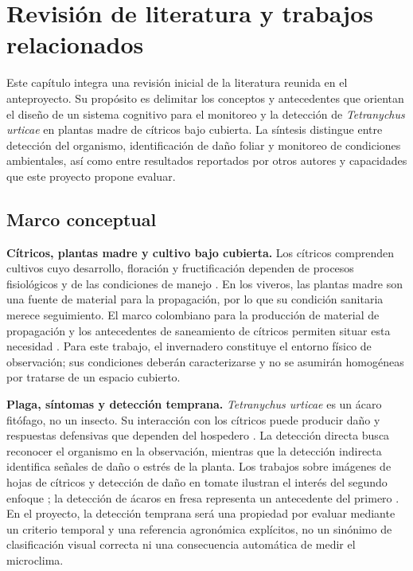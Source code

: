 
\chapter{Revisión de literatura y trabajos relacionados}
\label{cap:estado-del-arte}

Este capítulo integra una revisión inicial de la literatura reunida en el
anteproyecto. Su propósito es delimitar los conceptos y antecedentes que
orientan el diseño de un sistema cognitivo para el monitoreo y la detección
de \textit{Tetranychus urticae} en plantas madre de cítricos bajo cubierta.
La síntesis distingue entre detección del organismo, identificación de daño
foliar y monitoreo de condiciones ambientales, así como entre resultados
reportados por otros autores y capacidades que este proyecto propone evaluar.

\section{Marco conceptual}
\label{sec:marco-conceptual}

\textbf{Cítricos, plantas madre y cultivo bajo cubierta.}
Los cítricos comprenden cultivos cuyo desarrollo, floración y fructificación
dependen de procesos fisiológicos y de las condiciones de manejo
\cite{gill2023citrus}. En los viveros, las plantas madre son una fuente de
material para la propagación, por lo que su condición sanitaria merece
seguimiento. El marco colombiano para la producción de material de propagación
y los antecedentes de saneamiento de cítricos permiten situar esta necesidad
\cite{ica2019resolucion,citrusCenter2012}. Para este trabajo, el invernadero
constituye el entorno físico de observación; sus condiciones deberán
caracterizarse y no se asumirán homogéneas por tratarse de un espacio cubierto.

\textbf{Plaga, síntomas y detección temprana.}
\textit{Tetranychus urticae} es un ácaro fitófago, no un insecto. Su interacción
con los cítricos puede producir daño y respuestas defensivas que dependen del
hospedero \cite{mesa2012acaros,agut2015}. La detección directa busca reconocer
el organismo en la observación, mientras que la detección indirecta identifica
señales de daño o estrés de la planta. Los trabajos sobre imágenes de hojas de
cítricos y detección de daño en tomate ilustran el interés del segundo enfoque
\cite{gonzalezgonzalez2021,nieuwenhuizen2020}; la detección de ácaros en fresa
representa un antecedente del primero \cite{zhou2023}. En el proyecto, la
detección temprana será una propiedad por evaluar mediante un criterio temporal
y una referencia agronómica explícitos, no un sinónimo de clasificación visual
correcta ni una consecuencia automática de medir el microclima.


